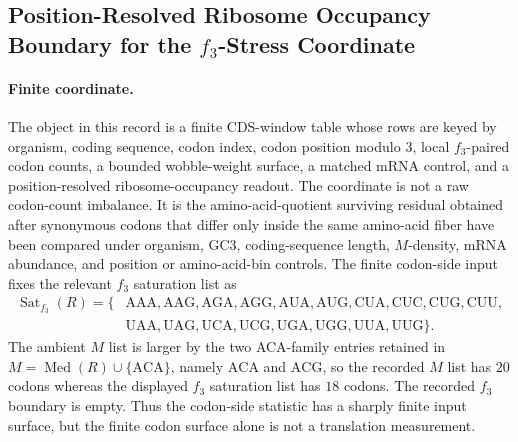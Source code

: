 \subsection{Position-Resolved Ribosome Occupancy Boundary for the $f_3$-Stress Coordinate}\label{subsec:q6-f3-stress-position-resolved-ribosome-occupancy-boundary}

\paragraph{Finite coordinate.}
The object in this record is a finite CDS-window table whose rows are keyed by organism, coding sequence, codon index, codon position modulo $3$, local $f_3$-paired codon counts, a bounded wobble-weight surface, a matched mRNA control, and a position-resolved ribosome-occupancy readout. The coordinate is not a raw codon-count imbalance. It is the amino-acid-quotient surviving residual obtained after synonymous codons that differ only inside the same amino-acid fiber have been compared under organism, GC3, coding-sequence length, $M$-density, mRNA abundance, and position or amino-acid-bin controls. The finite codon-side input fixes the relevant $f_3$ saturation list as
$$
\begin{aligned}
\operatorname{Sat}_{f_3}(R) = \{&\mathrm{AAA},\mathrm{AAG},\mathrm{AGA},\mathrm{AGG},\mathrm{AUA},\mathrm{AUG},\mathrm{CUA},\mathrm{CUC},\mathrm{CUG},\mathrm{CUU},\\
&\mathrm{UAA},\mathrm{UAG},\mathrm{UCA},\mathrm{UCG},\mathrm{UGA},\mathrm{UGG},\mathrm{UUA},\mathrm{UUG}\}.
\end{aligned}
$$
The ambient $M$ list is larger by the two ACA-family entries retained in $M=\operatorname{Med}(R)\cup\{\mathrm{ACA}\}$, namely $\mathrm{ACA}$ and $\mathrm{ACG}$, so the recorded $M$ list has $20$ codons whereas the displayed $f_3$ saturation list has $18$ codons. The recorded $f_3$ boundary is empty. Thus the codon-side statistic has a sharply finite input surface, but the finite codon surface alone is not a translation measurement.

